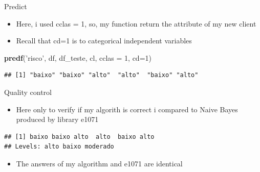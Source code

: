 \documentclass[
  10pt,
  ignorenonframetext,
]{beamer}
\newenvironment{Shaded}{\begin{snugshade}}{\end{snugshade}}
\newcommand{\DataTypeTok}[1]{\textcolor[rgb]{0.13,0.29,0.53}{#1}}
\newcommand{\DecValTok}[1]{\textcolor[rgb]{0.00,0.00,0.81}{#1}}
\newcommand{\KeywordTok}[1]{\textcolor[rgb]{0.13,0.29,0.53}{\textbf{#1}}}
\newcommand{\NormalTok}[1]{#1}
\newcommand{\OperatorTok}[1]{\textcolor[rgb]{0.81,0.36,0.00}{\textbf{#1}}}
\newcommand{\StringTok}[1]{\textcolor[rgb]{0.31,0.60,0.02}{#1}}
\providecommand{\tightlist}{%
  \setlength{\itemsep}{0pt}\setlength{\parskip}{0pt}}
\begin{document}
\begin{frame}[fragile]{Predict}
\protect\hypertarget{predict-2}{}

\begin{itemize}
\tightlist
\item
  Here, i used cclas = 1, so, my function return the attribute of my new
  client
\item
  Recall that cd=1 is to categorical independent variables
\end{itemize}

\begin{Shaded}
\begin{Highlighting}[]
\KeywordTok{predf}\NormalTok{(}\StringTok{'risco'}\NormalTok{, df, df_teste, cl, }\DataTypeTok{cclas =} \DecValTok{1}\NormalTok{, }\DataTypeTok{cd=}\DecValTok{1}\NormalTok{)}
\end{Highlighting}
\end{Shaded}

\begin{verbatim}
## [1] "baixo" "baixo" "alto"  "alto"  "baixo" "alto"
\end{verbatim}

\end{frame}

\begin{frame}[fragile]{Quality control}
\protect\hypertarget{quality-control}{}

\begin{itemize}
\tightlist
\item
  Here only to verify if my algorith is correct i compared to Naive
  Bayes produced by library e1071
\end{itemize}

\begin{Shaded}
\end{Shaded}

\begin{verbatim}
## [1] baixo baixo alto  alto  baixo alto 
## Levels: alto baixo moderado
\end{verbatim}

\begin{itemize}
\tightlist
\item
  The answers of my algorithm and e1071 are identical
\end{itemize}

\end{frame}
\end{document}
